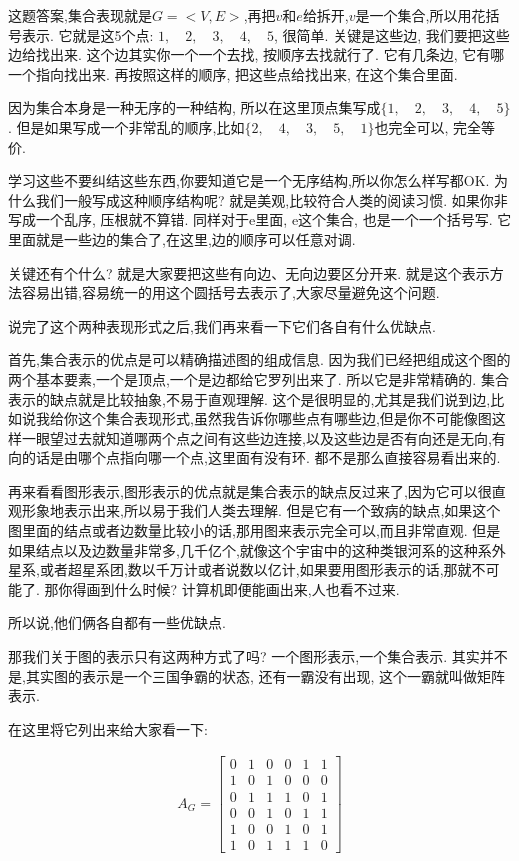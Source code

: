 这题答案,集合表现就是$G=<V,E>$,再把$v$和$e$给拆开,$v$是一个集合,所以用花括号表示. 它就是这5个点: $1, \quad 2, \quad 3, \quad 4, \quad 5$, 很简单. 关键是这些边, 我们要把这些边给找出来. 这个边其实你一个一个去找, 按顺序去找就行了. 它有几条边, 它有哪一个指向找出来. 再按照这样的顺序, 把这些点给找出来, 在这个集合里面. 

因为集合本身是一种无序的一种结构, 所以在这里顶点集写成$\{1, \quad 2, \quad 3, \quad 4, \quad 5\}$. 但是如果写成一个非常乱的顺序,比如$\{2, \quad 4, \quad 3, \quad 5, \quad 1\}$也完全可以, 完全等价. 

学习这些不要纠结这些东西,你要知道它是一个无序结构,所以你怎么样写都OK. 为什么我们一般写成这种顺序结构呢? 就是美观,比较符合人类的阅读习惯. 如果你非写成一个乱序, 压根就不算错. 同样对于e里面, e这个集合, 也是一个一个括号写. 它里面就是一些边的集合了,在这里,边的顺序可以任意对调. 

关键还有个什么? 就是大家要把这些有向边、无向边要区分开来. 就是这个表示方法容易出错,容易统一的用这个圆括号去表示了,大家尽量避免这个问题. 

说完了这个两种表现形式之后,我们再来看一下它们各自有什么优缺点. 

首先,集合表示的优点是可以精确描述图的组成信息. 因为我们已经把组成这个图的两个基本要素,一个是顶点,一个是边都给它罗列出来了. 所以它是非常精确的. 集合表示的缺点就是比较抽象,不易于直观理解. 这个是很明显的,尤其是我们说到边,比如说我给你这个集合表现形式,虽然我告诉你哪些点有哪些边,但是你不可能像图这样一眼望过去就知道哪两个点之间有这些边连接,以及这些边是否有向还是无向,有向的话是由哪个点指向哪一个点,这里面有没有环. 都不是那么直接容易看出来的. 

再来看看图形表示,图形表示的优点就是集合表示的缺点反过来了,因为它可以很直观形象地表示出来,所以易于我们人类去理解. 但是它有一个致病的缺点,如果这个图里面的结点或者边数量比较小的话,那用图来表示完全可以,而且非常直观. 但是如果结点以及边数量非常多,几千亿个,就像这个宇宙中的这种类银河系的这种系外星系,或者超星系团,数以千万计或者说数以亿计,如果要用图形表示的话,那就不可能了. 那你得画到什么时候? 计算机即便能画出来,人也看不过来. 

所以说,他们俩各自都有一些优缺点. 

那我们关于图的表示只有这两种方式了吗? 一个图形表示,一个集合表示. 其实并不是,其实图的表示是一个三国争霸的状态, 还有一霸没有出现, 这个一霸就叫做矩阵表示. 

在这里将它列出来给大家看一下: 

\begin{align*}
  A_G = \begin{bmatrix}
  0 & 1 & 0 & 0 & 1 & 1 \\  
  1 & 0 & 1 & 0 & 0 & 0 \\
  0 & 1 & 1 & 1 & 0 & 1 \\ 
  0 & 0 & 1 & 0 & 1 & 1 \\ 
  1 & 0 & 0 & 1 & 0 & 1 \\
  1 & 0 & 1 & 1 & 1 & 0
  \end{bmatrix} 
\end{align*}

